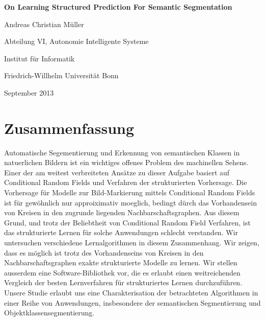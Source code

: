 \documentclass[12pt,toc=bibnumbered, a4paper,twoside,DIV=calc]{scrbook}
\begin{document}
\begin{spacing}{1}
\begin{titlepage}
\begin{center}
\vspace*{1in}
\textbf{{\LARGE On Learning Structured Prediction For Semantic Segmentation}}
\par
\vspace{1.5in} {\large Andreas Christian M\"uller}
\par \vspace{0.5in}
Abteilung VI, Autonomie Intelligente Systeme \par
Institut f\"ur Informatik
\par \vspace{0.5in}
Friedrich-Willhelm Universit\"at Bonn \par
\vspace{0.5in} September 2013 \end{center}

\end{titlepage}


\tableofcontents
\end{spacing}
\chapter*{Zusammenfassung}
Automatische Segementierung und Erkennung von semantischen Klassen in
natuerlichen Bildern ist ein wichtiges offenes Problem des machinellen Sehens.
Einer der am weitest verbreiteten Ans\"atze zu dieser Aufgabe basiert auf
Conditional Random Fields und Verfahren der strukturierten Vorhersage. Die
Vorhersage f\"ur Modelle zur Bild-Markierung mittels Conditional Random Fields
ist f\"ur gew\"ohnlich nur approiximativ moeglich, bedingt d\"urch das
Vorhandensein von Kreisen in den zugrunde liegenden Nachbarschaftsgraphen.
Aus diesem Grund, und trotz der Beliebtheit von Conditional Random Field
Verfahren, ist das strukturierte Lernen f\"ur solche Anwendungen schlecht
verstanden.
%
Wir untersuchen verschiedene Lernalgorithmen in diesem
Zusammenhang. Wir zeigen, dass es m\"oglich ist trotz des Vorhandenseins von
Kreisen in den Nachbarschaftsgraphen exakte strukturierte Modelle zu lernen.
Wir stellen ausserdem eine Software-Bibliothek vor, die es erlaubt einen
weitreichenden Vergleich der besten Lernverfahren f\"ur strukturiertes Lernen
durchzuf\"uhren.
Unsere Studie erlaubt uns eine Charakterisation der betrachteten Algorithmen
in einer Reihe von Anwendungen, insbesondere der semantischen Segmentierung und
Objektklassensegmentierung.
\end{document}
